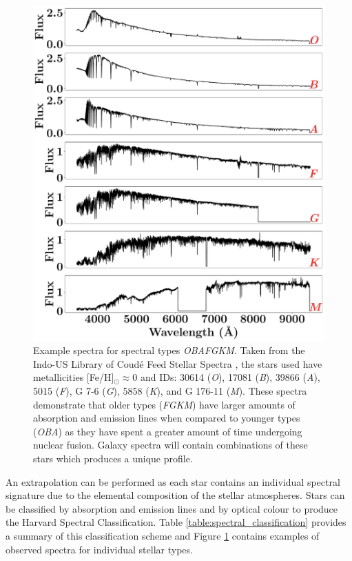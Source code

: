 \documentclass[12pt, twocolumn, nofootinbib]{revtex4-1}    %
\begin{document}
\begin{figure}
\includegraphics[width=1.0\linewidth]{introduction/spectral_types}
\caption{Example spectra for spectral types \textit{OBAFGKM}. Taken from the Indo-US Library of Coudé Feed Stellar Spectra \citep{2004ApJS..152..251V}, the stars used have metallicities [Fe/H]$_{\odot} \approx0$  and IDs: 30614 (\textit{O}), 17081 (\textit{B}), 39866 (\textit{A}), 5015 (\textit{F}), G 7-6 (\textit{G}), 5858 (\textit{K}), and G 176-11 (\textit{M}). These spectra demonstrate that older types (\textit{FGKM}) have larger amounts of absorption and emission lines when compared to younger types (\textit{OBA}) as they have spent a greater amount of time undergoing nuclear fusion. Galaxy spectra will contain combinations of these stars which produces a unique profile.}
\label{fig:spectral_types}
\end{figure}

An extrapolation can be performed as each star contains an individual spectral signature due to the elemental composition of the stellar atmospheres. Stars can be classified by absorption and emission lines and by optical colour to produce the Harvard Spectral Classification. Table \ref{table:spectral_classification} provides a summary of this classification scheme and Figure \ref{fig:spectral_types} contains examples of observed spectra for individual stellar types. 
\end{document}
